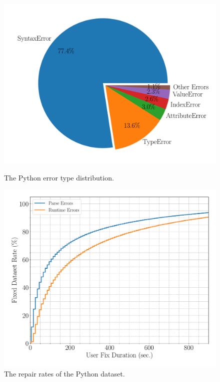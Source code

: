 \begin{figure}[t]
  \centering
  \begin{minipage}[c]{0.46\linewidth}
    \centering
    \includegraphics[width=\linewidth]{error-pie.pdf}
    \caption{The Python error type distribution.}
    \label{fig:error-statistics}
  \end{minipage}
  \hspace{0.04\linewidth}
  \begin{minipage}[c]{0.42\linewidth}
      \centering
      \includegraphics[width=\linewidth]{fixed-rate.pdf}
      \caption{The repair rates of the Python dataset.}
      \label{fig:repair-rate}
  \end{minipage}
\end{figure}

